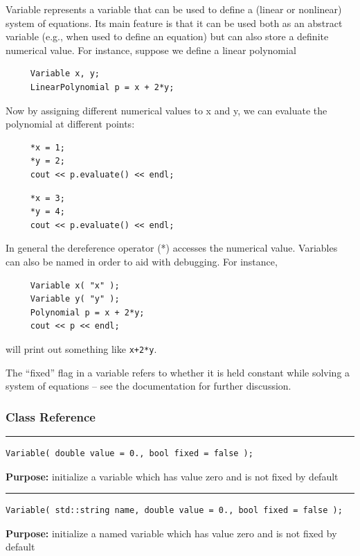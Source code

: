 \documentclass{article}
\begin{document}
 Variable represents a variable that can be used to define a (linear or nonlinear) system of equations.  Its main feature is that it can be used both as an abstract variable (e.g., when used to define an equation) but can also store a definite numerical value.  For instance, suppose we define a linear polynomial 

 \begin{verbatim}
     Variable x, y;
     LinearPolynomial p = x + 2*y;
 \end{verbatim}
\vspace{-\baselineskip} Now by assigning different numerical values to x and y, we can evaluate the polynomial at different points: 

 \begin{verbatim}
     *x = 1;
     *y = 2;
     cout << p.evaluate() << endl;
 \end{verbatim}
\vspace{-\baselineskip} \begin{verbatim}
     *x = 3;
     *y = 4;
     cout << p.evaluate() << endl;
 \end{verbatim}
\vspace{-\baselineskip} In general the dereference operator (*) accesses the numerical value. Variables can also be named in order to aid with debugging.  For instance, 

 \begin{verbatim}
     Variable x( "x" );
     Variable y( "y" );
     Polynomial p = x + 2*y;
     cout << p << endl;
 \end{verbatim}
\vspace{-\baselineskip} will print out something like \texttt{x+2*y}. 

 The ``fixed'' flag in a variable refers to whether it is held constant while solving a system of equations -- see the documentation for further discussion. 



\subsubsection{Class Reference}

\rule{5in}{1pt}
\begin{verbatim}
Variable( double value = 0., bool fixed = false );
\end{verbatim}
\textbf{Purpose:}
initialize a variable which has value zero and is not fixed by default

\hspace{-.21in}\rule{5in}{1pt}
\begin{verbatim}
Variable( std::string name, double value = 0., bool fixed = false );
\end{verbatim}
\textbf{Purpose:}
initialize a named variable which has value zero and is not fixed by default
\end{document}
